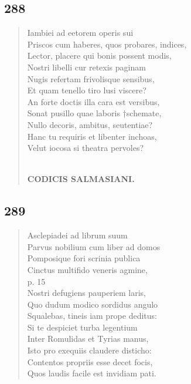 \documentclass[11pt, a4paper]{report}
\begin{document}
            \subsection*{288}
      \begin{verse}
      Iambiei ad eetorem operis sui \\ Priscos cum haberes, quos probares, indices, \\ Lector, placere qui bonis possent modis, \\ Nostri libelli cur retexis paginam \\ Nugis refertam frivolisque sensibus, \\ Et quam tenello tiro lusi viscere? \\ An forte doctis illa cara est versibus, \\ Sonat pusillo quae laboris †schemate, \\ Nullo decoris, ambitus, seutentiae? \\ Hanc tu requiris et libenter inchoas, \\ Velut iocosa si theatra pervoles? \\ 
        ﻿\pagebreak 
    \begin{center} \textbf{CODICIS SALMASIANI.} \end{center} \marginpar{[249]} 
      \end{verse}
  
            \subsection*{289}
      \begin{verse}
      Asclepiadei ad librum suum \\ Parvus nobilium cum liber ad domos \\ Pomposique fori scrinia publica \\ Cinctus multifido veneris agmine, \\ p. 15 \\ Nostri defugiens pauperiem laris, \\ Quo dudum modico sordidus angulo \\ Squalebas, tineis iam prope deditus: \\ Si te despiciet turba legentium \\ Inter Romulidas et Tyrias manus, \\ Isto pro exequiis claudere disticho: \\ Contentos propriis esse decet focis, \\ Quos laudis facile est invidiam pati. \\ 
      \end{verse}
  
\end{document}
